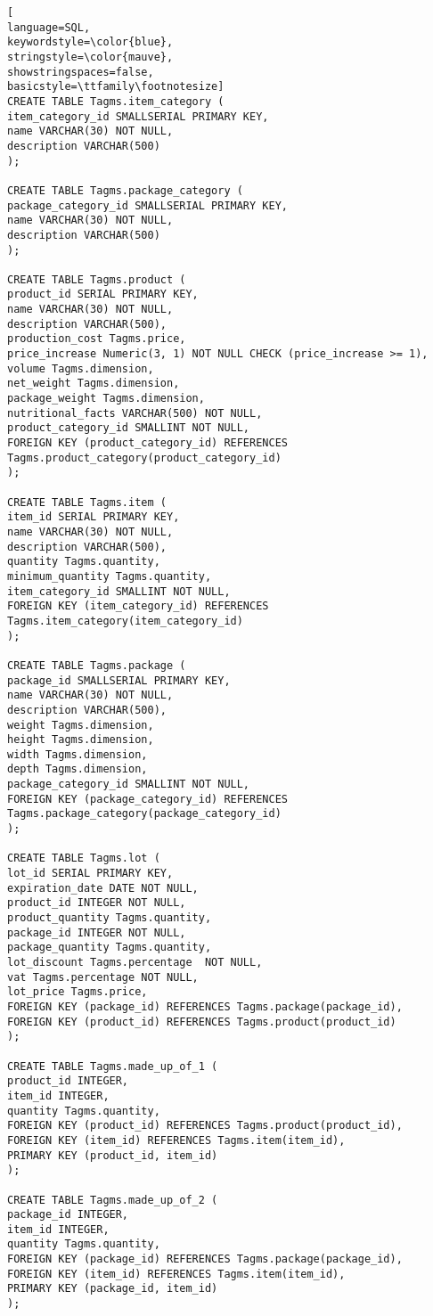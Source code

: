 \begin{lstlisting}[
language=SQL,
keywordstyle=\color{blue},
stringstyle=\color{mauve},
showstringspaces=false,
basicstyle=\ttfamily\footnotesize]
CREATE TABLE Tagms.item_category (
item_category_id SMALLSERIAL PRIMARY KEY,
name VARCHAR(30) NOT NULL,
description VARCHAR(500)
);

CREATE TABLE Tagms.package_category (
package_category_id SMALLSERIAL PRIMARY KEY,
name VARCHAR(30) NOT NULL,
description VARCHAR(500)
);

CREATE TABLE Tagms.product (
product_id SERIAL PRIMARY KEY,
name VARCHAR(30) NOT NULL,
description VARCHAR(500),
production_cost Tagms.price,
price_increase Numeric(3, 1) NOT NULL CHECK (price_increase >= 1),
volume Tagms.dimension,
net_weight Tagms.dimension,
package_weight Tagms.dimension,
nutritional_facts VARCHAR(500) NOT NULL,
product_category_id SMALLINT NOT NULL,
FOREIGN KEY (product_category_id) REFERENCES Tagms.product_category(product_category_id)
);

CREATE TABLE Tagms.item (
item_id SERIAL PRIMARY KEY,
name VARCHAR(30) NOT NULL,
description VARCHAR(500),
quantity Tagms.quantity,
minimum_quantity Tagms.quantity,
item_category_id SMALLINT NOT NULL,
FOREIGN KEY (item_category_id) REFERENCES Tagms.item_category(item_category_id)
);

CREATE TABLE Tagms.package (
package_id SMALLSERIAL PRIMARY KEY,
name VARCHAR(30) NOT NULL,
description VARCHAR(500),
weight Tagms.dimension,
height Tagms.dimension,
width Tagms.dimension,
depth Tagms.dimension,
package_category_id SMALLINT NOT NULL,
FOREIGN KEY (package_category_id) REFERENCES Tagms.package_category(package_category_id)
);

CREATE TABLE Tagms.lot (
lot_id SERIAL PRIMARY KEY,
expiration_date DATE NOT NULL,
product_id INTEGER NOT NULL,
product_quantity Tagms.quantity,
package_id INTEGER NOT NULL,
package_quantity Tagms.quantity,
lot_discount Tagms.percentage  NOT NULL,
vat Tagms.percentage NOT NULL,
lot_price Tagms.price,
FOREIGN KEY (package_id) REFERENCES Tagms.package(package_id),
FOREIGN KEY (product_id) REFERENCES Tagms.product(product_id)
);

CREATE TABLE Tagms.made_up_of_1 (
product_id INTEGER,
item_id INTEGER,
quantity Tagms.quantity,
FOREIGN KEY (product_id) REFERENCES Tagms.product(product_id),
FOREIGN KEY (item_id) REFERENCES Tagms.item(item_id),
PRIMARY KEY (product_id, item_id)
);

CREATE TABLE Tagms.made_up_of_2 (
package_id INTEGER,
item_id INTEGER,
quantity Tagms.quantity,
FOREIGN KEY (package_id) REFERENCES Tagms.package(package_id),
FOREIGN KEY (item_id) REFERENCES Tagms.item(item_id),
PRIMARY KEY (package_id, item_id)
);


\end{lstlisting}

